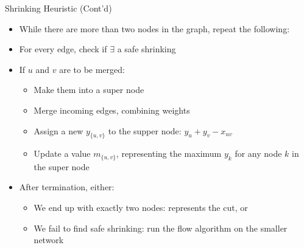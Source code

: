 \documentclass[10pt]{beamer}
\begin{document}
\begin{frame}{Shrinking Heuristic (Cont'd)}
\begin{itemize}
\item<1-> While there are more than two nodes in the graph, repeat the following:
\item<2-> For every edge, check if $\exists$ a safe shrinking
\item<3-> If $u$ and $v$ are to be merged:
	\begin{itemize}
	\item<4-> Make them into a \alert{super node}
	\item<5-> Merge incoming edges, combining weights
	\item<6-> Assign a new $y_{\{u, v \}}$ to the supper node: $y_u + y_v - x_{uv}$
	\item<7-> Update a value $m_{\{u, v \}}$, representing the maximum $y_k$ for any node $k$ in the super node
	\end{itemize}
\item<8-> After termination, either:
	\begin{itemize}
	\item<9-> We end up with exactly two nodes: \alert{represents the cut}, or
	\item<10-> We fail to find safe shrinking: run the flow algorithm on the \alert{smaller} network
	\end{itemize}
\end{itemize}
\end{frame}
\end{document}
